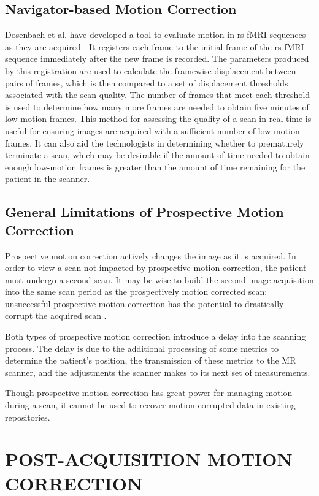 \subsection{Navigator-based Motion Correction}

Dosenbach et al. have developed a tool to evaluate motion in rs-fMRI sequences as they are acquired \cite{Dosenbach2017}. It registers each frame to the initial frame of the rs-fMRI sequence immediately after the new frame is recorded. The parameters produced by this registration are used to calculate the framewise displacement between pairs of frames, which is then compared to a set of displacement thresholds associated with the scan quality. The number of frames that meet each threshold is used to determine how many more frames are needed to obtain five minutes of low-motion frames. This method for assessing the quality of a scan in real time is useful for ensuring images are acquired with a sufficient number of low-motion frames. It can also aid the technologists in determining whether to prematurely terminate a scan, which may be desirable if the amount of time needed to obtain enough low-motion frames is greater than the amount of time remaining for the patient in the scanner. 


\subsection{General Limitations of Prospective Motion Correction}

Prospective motion correction actively changes the image as it is acquired. In order to view a scan not impacted by prospective motion correction, the patient must undergo a second scan. It may be wise to build the second image acquisition into the same scan period as the prospectively motion corrected scan: unsuccessful prospective motion correction has the potential to drastically corrupt the acquired scan \cite{Zaitsev2017}.

Both types of prospective motion correction introduce a delay into the scanning process. The delay is due to the additional processing of some metrics to determine the patient's position, the transmission of these metrics to the MR scanner, and the adjustments the scanner makes to its next set of measurements.

Though prospective motion correction has great power for managing motion during a scan, it cannot be used to recover motion-corrupted data in existing repositories.


\section{POST-ACQUISITION MOTION CORRECTION}


